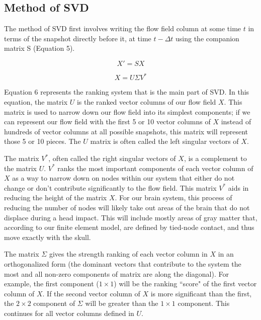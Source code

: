 \documentclass[%
 aip,
 amsmath,amssymb,
 reprint,%
 floatfix,%
]{revtex4-1}
\begin{document}
\subsection{Method of SVD}

The method of SVD first involves writing the flow field column at some time $t$ in terms of the snapshot directly before it, at time $t - \Delta t$ using the companion matrix S (Equation 5).

\begin{equation}
	X' = SX
\end{equation}

\begin{equation}
	X = U \Sigma V^*
\end{equation}

Equation 6 represents the ranking system that is the main part of SVD. In this equation, the matrix $U$ is the ranked vector columns of our flow field $X$. This matrix is used to narrow down our flow field into its simplest components; if we can represent our flow field with the first 5 or 10 vector columns of $X$ instead of hundreds of vector columns at all possible snapshots, this matrix will represent those 5 or 10 pieces. The $U$ matrix is often called the left singular vectors of $X$. 

The matrix $V^*$, often called the right singular vectors of $X$, is a complement to the matrix $U$. $V^*$ ranks the most important components of each vector column of $X$ as a way to narrow down on nodes within our system that either do not change or don't contribute significantly to the flow field. This matrix $V^*$ aids in reducing the height of the matrix $X$. For our brain system, this process of reducing the number of nodes will likely take out areas of the brain that do not displace during a head impact. This will include mostly areas of gray matter that, according to our finite element model, are defined by tied-node contact, and thus move exactly with the skull.

The matrix $\Sigma$ gives the strength ranking of each vector column in $X$ in an orthogonalized form (the dominant vectors that contribute to the system the most and all non-zero components of matrix are along the diagonal). For example, the first component ($1 \times 1$) will be the ranking ``score" of the first vector column of $X$. If the second vector column of $X$ is more significant than the first, the $2 \times 2$ component of $\Sigma$ will be greater than the $1 \times 1$ component. This continues for all vector columns defined in $U$.
\end{document}
